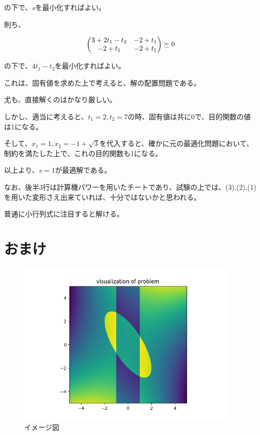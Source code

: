 \documentclass[a4paper, 10pt, dvipdfmx]{jlreq}
\begin{document}
の下で、$s$を最小化すればよい。

則ち、

\begin{align*}
  \mqty(
  3+2t_1-t_2 & -2+t_1 \\
  -2+t_1     & -2+t_1
  ) \succeq 0
\end{align*}

の下で、$4t_1-t_2$を最小化すればよい。


{\color{lightgray}

これは、固有値を求めた上で考えると、解の配置問題である。

尤も、直接解くのはかなり厳しい。

しかし、適当に考えると、$t_1=2,t_2=7$の時、固有値は共に0で、目的関数の値は1になる。
}

そして、$x_1=1,x_2=-1+\sqrt{3}$を代入すると、確かに元の最適化問題において、制約を満たした上で、これの目的関数も1になる。

以上より、$s=1$が最適解である。

{\color{lightgray}

なお、後半3行は計算機パワーを用いたチートであり、試験の上では、(3),(2),(1)を用いた変形さえ出来ていれば、十分ではないかと思われる。

}

{\color{red}

普通に小行列式に注目すると解ける。

}

\section{おまけ}



\begin{figure}[htbp]
  \begin{center}
    \includegraphics[height=80mm]{4_vis.png}
    \caption{イメージ図}
  \end{center}
\end{figure}
\end{document}
